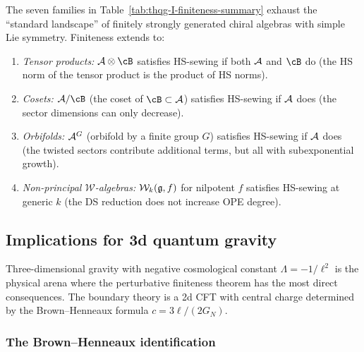 \begin{remark}[Exhaustiveness]
The seven families in Table~\ref{tab:thqg-I-finiteness-summary} exhaust the ``standard landscape'' of finitely strongly generated chiral algebras with simple Lie symmetry. Finiteness extends to:
\begin{enumerate}[label=\textup{(\alph*)}]
\item \emph{Tensor products:} $\cA \otimes \cB$ satisfies HS-sewing if both $\mathcal{A}$ and $\cB$ do (the HS norm of the tensor product is the product of HS norms).
\item \emph{Cosets:} $\cA / \cB$ (the coset of $\cB \subset \cA$) satisfies HS-sewing if $\mathcal{A}$ does (the sector dimensions can only decrease).
\item \emph{Orbifolds:} $\mathcal{A}^G$ (orbifold by a finite group $G$) satisfies HS-sewing if $\mathcal{A}$ does (the twisted sectors contribute additional terms, but all with subexponential growth).
\item \emph{Non-principal $\mathcal{W}$-algebras:} $\mathcal{W}_k(\mathfrak{g}, f)$ for nilpotent $f$ satisfies HS-sewing at generic $k$ (the DS reduction does not increase OPE degree).
\end{enumerate}
\end{remark}



\subsection{Implications for 3d quantum gravity}
\label{subsec:thqg-I-3d-gravity}

Three-dimensional gravity with negative cosmological constant $\Lambda = -1/\ell^2$ is the physical arena where the perturbative finiteness theorem has the most direct consequences. The boundary theory is a 2d CFT with central charge determined by the Brown--Henneaux formula $c = 3\ell/(2G_N)$.

\subsubsection{The Brown--Henneaux identification}

